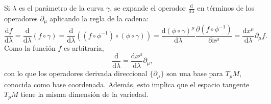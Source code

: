 \begin{center}
\end{center}
Si $\lambda$ es el parámetro de la curva $\gamma$, se expande el operador $\frac{\mathrm{d}}{\mathrm{d}\lambda}$ en términos de los operadores $\partial_\mu$ aplicando la regla de la cadena:
$$\frac{\mathrm{d}f}{\mathrm{d}\lambda}=\frac{\mathrm{d}}{\mathrm{d}\lambda}(f\circ\gamma)=\frac{\mathrm{d}}{\mathrm{d}\lambda}((f\circ\phi^{-1})\circ(\phi\circ\gamma))=\frac{\mathrm{d}(\phi\circ\gamma)^\mu}{\mathrm{d}\lambda}\frac{\partial(f\circ\phi^{-1})}{\partial x^\mu}=\frac{\mathrm{d}x^\mu}{\mathrm{d}\lambda}\partial_\mu f.$$
Como la función $f$ es arbitraria,
$$\frac{\mathrm{d}}{\mathrm{d}\lambda}=\frac{\mathrm{d}x^\mu}{\mathrm{d}\lambda}\partial_\mu,$$
con lo que los operadores derivada direccional $\{\partial_\mu\}$ son una base para $T_pM$, conocida como base coordenada. Además, esto implica que el espacio tangente $T_pM$ tiene la misma dimensión de la variedad.


